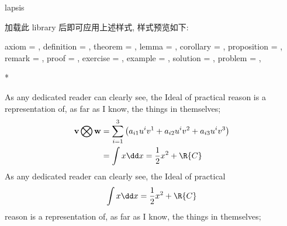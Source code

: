 \begin{function}[updated=2024-12-05]{lapsis}
  \begin{syntax}
  \end{syntax}
  加载此 library 后即可应用上述样式, 样式预览如下: 
\end{function}
\begingroup
\zthmtitleformat{\bfseries
\zthmname\ \zthmnumber
\zthmnotemptyTF{}{\\}
\zthmnote{}{}
}
\zthmiconset
  {
    axiom       = ,
    definition  = , 
    theorem     = , 
    lemma       = ,
    corollary   = , 
    proposition = , 
    remark      = ,
    proof       = , 
    exercise    = ,
    example     = ,
    solution    = , 
    problem     = ,
  }
\begin{DocExample}*
\begin{lemma}
As any dedicated reader can clearly see, the Ideal of practical
reason is a representation of, as far as I know, the things in themselves; 
\begin{align}
\underset{}{\mathbf{v} \bigotimes \mathbf{w}} 
    & = \sum_{i=1}^3\left(a_{i1}u^iv^1+a_{i2}u^iv^2+a_{i3}u^iv^3\right) \\
    & = \int x \dd x = \frac12 x^2 + \R{C} 
  \end{align}  
As any dedicated reader can clearly see, the Ideal of practical
\tcblower
\begin{align}
  \int x \dd x = \frac12 x^2 + \R{C}
\end{align}
reason is a representation of, as far as I know, the things in themselves;%
\end{lemma}
\end{DocExample}
\endgroup


